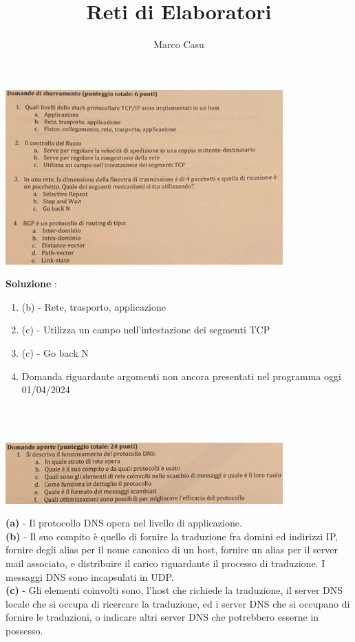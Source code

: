 \documentclass[12pt, letterpaper]{article}
\title{Reti di Elaboratori}
\author{Marco Casu}
\date{\vspace{-5ex}}
\newcommand{\acc}{\\\hphantom{}\\}
\begin{document}
\begin{center}
    \includegraphics[width=0.8\textwidth ]{sbarramento.png}
\end{center}
\textbf{Soluzione} :
\begin{enumerate}
    \item (b) - Rete, trasporto, applicazione 
    \item (c) - Utilizza un campo nell'intestazione dei segmenti TCP 
    \item (c) - Go back N 
    \item \color{red}Domanda riguardante argomenti
    non ancora presentati 
    nel programma oggi 01/04/2024\color{black}
\end{enumerate}
\hphantom{text}\acc
\begin{center}
    \includegraphics[width=0.8\textwidth ]{aperte1.png}
\end{center}
\textbf{(a)} - Il protocollo DNS opera nel livello di applicazione.\\ 
\textbf{(b)} - Il suo compito è quello di fornire la traduzione fra domini ed indirizzi 
IP, fornire degli alias per il nome canonico di un host, fornire un alias per il 
server mail associato, e distribuire il carico riguardante il processo di traduzione. I 
messaggi DNS sono incapsulati in UDP.\\
\textbf{(c)} - Gli elementi coinvolti sono, l'host che richiede la traduzione, il server DNS 
locale che si occupa di ricercare la traduzione, ed i server DNS che si occupano di fornire le traduzioni, 
o indicare altri server DNS che potrebbero esserne in possesso.\\
\end{document}
